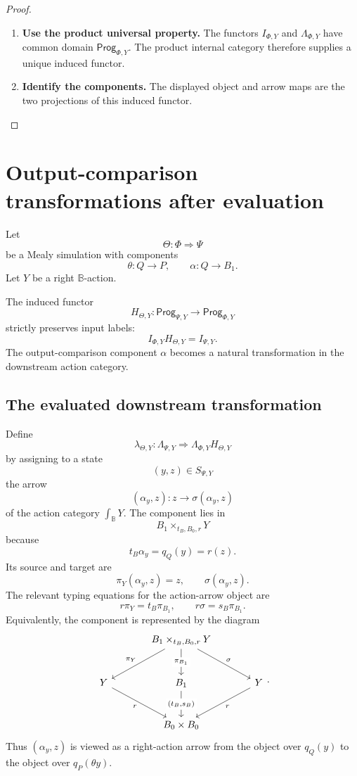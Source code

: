 \begin{proof}
\leavevmode
\begin{enumerate}
\item \textbf{Use the product universal property.}
The functors \(I_{\Phi,Y}\) and \(\Lambda_{\Phi,Y}\) have common domain
\(\mathsf{Prog}_{\Phi,Y}\). The product internal category therefore supplies
a unique induced functor.

\item \textbf{Identify the components.}
The displayed object and arrow maps are the two projections of this induced
functor.
\end{enumerate}
\end{proof}

\section{Output-comparison transformations after evaluation}
\label{sec:relative-output-comparison-transformations}

Let
\[
\Theta:\Phi\Rightarrow\Psi
\]
be a Mealy simulation with components
\[
\theta:Q\to P,
\qquad
\alpha:Q\to B_1.
\]
Let \(Y\) be a right \(\mathbb B\)-action.

The induced functor
\[
H_{\Theta,Y}:
\mathsf{Prog}_{\Psi,Y}\to\mathsf{Prog}_{\Phi,Y}
\]
strictly preserves input labels:
\[
I_{\Phi,Y}H_{\Theta,Y}=I_{\Psi,Y}.
\]
The output-comparison component \(\alpha\) becomes a natural transformation in
the downstream action category.

\subsection{The evaluated downstream transformation}
\label{subsec:relative-downstream-transformation}

\begin{definition}
\label{def:relative-downstream-comparison-transformation}
Define
\[
\lambda_{\Theta,Y}:
\Lambda_{\Psi,Y}
\Rightarrow
\Lambda_{\Phi,Y}H_{\Theta,Y}
\]
by assigning to a state
\[
(y,z)\in S_{\Psi,Y}
\]
the arrow
\[
(\alpha_y,z)
:
z\to \sigma(\alpha_y,z)
\]
of the action category \(\int_{\mathbb B}Y\).
The component lies in
\[
B_1\times_{t_B,B_0,r}Y
\]
because
\[
t_B\alpha_y=q_Q(y)=r(z).
\]
Its source and target are
\[
\pi_Y(\alpha_y,z)=z,
\qquad
\sigma(\alpha_y,z).
\]
The relevant typing equations for the action-arrow object are
\[
r\pi_Y=t_B\pi_{B_1},
\qquad
r\sigma=s_B\pi_{B_1}.
\]
Equivalently, the component is represented by the diagram
\[
\begin{tikzcd}[column sep=large,row sep=large]
&
B_1\times_{t_B,B_0,r}Y
\arrow[dl,"\pi_Y"']
\arrow[dr,"\sigma"]
\arrow[d,"\pi_{B_1}" description]
&
\\
Y
\arrow[dr,"r"']
&
B_1
\arrow[d,"{(t_B,s_B)}" description]
&
Y
\arrow[dl,"r"]
\\
&
B_0\times B_0
&
\end{tikzcd}
.
\]
Thus \((\alpha_y,z)\) is viewed as a right-action arrow from the object over
\(q_Q(y)\) to the object over \(q_P(\theta y)\).
\end{definition}

